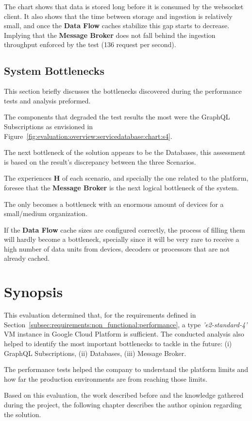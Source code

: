 The chart shows that data is stored long before it is consumed by the websocket client. It also shows that the time between storage and ingestion is relatively small, and once the \textbf{Data Flow} caches stabilize this gap starts to decrease. Implying that the \textbf{Message Broker} does not fall behind the ingestion throughput enforced by the test (136 request per second).

\subsection{System Bottlenecks}
\label{sec:evaluation:overview:bottlenecks}

This section briefly discusses the bottlenecks discovered during the performance tests and analysis preformed.

The components that degraded the test results the most were the GraphQL Subscriptions as envisioned in Figure~\ref{fig:evaluation:overview:servicedatabase:chart:s4}.

The next bottleneck of the solution appears to be the  Databases, this assessment is based on the result's discrepancy between the three Scenarios.

The experiences \textbf{H} of each scenario, and specially the one related to the platform, foresee that the \textbf{Message Broker} is the next logical bottleneck of the system.

The  only becomes a bottleneck with an enormous amount of devices for a small/medium organization.

If the \textbf{Data Flow} cache sizes are configured correctly, the process of filling them will hardly become a bottleneck, specially since it will be very rare to receive a high number of data units from devices, decoders or processors that are not already cached.

\section{Synopsis}
\label{sec:evaluation:synopsis}

This evaluation determined that, for the requirements defined in Section~\ref{subsec:requirements:non_functional:performance}, a type \textit{'e2-standard-4'} \gls{VM} instance in Google Cloud Platform is sufficient. The conducted analysis also helped to identify the most important bottlenecks to tackle in the future: (i) GraphQL Subscriptions, (ii)  Databases, (iii) Message Broker.

The performance tests helped the company to understand the platform limits and how far the production environments are from reaching those limits.

Based on this evaluation, the work described before and the knowledge gathered during the project, the following chapter describes the author opinion regarding the solution.
